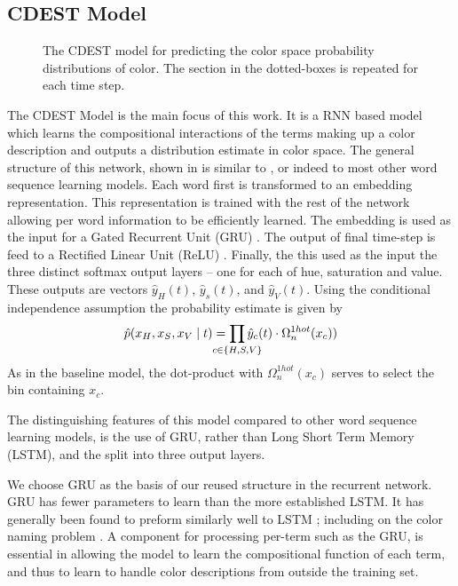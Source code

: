 \documentclass[11pt,letterpaper]{article}
\newcommand{\parencite}{\cite}
\newcommand{\textcite}{\newcite}
\begin{document}
\subsection{CDEST Model}

\begin{figure}
	\resizebox{\columnwidth}{!}{}
	
	\caption{\label{network}
		The CDEST model for predicting the color space probability distributions of color.
		The section in the dotted-boxes is repeated for each time step.
	}
\end{figure}

The CDEST Model is the main focus of this work.
It is a RNN based model which learns the compositional interactions of the terms making up a color description and outputs a distribution estimate in color space.
The general structure of this network, shown in  is similar to \textcite{2016arXiv160603821M}, or indeed to most other word sequence learning models.
Each word first is transformed to an embedding representation.
This representation is trained with the rest of the network allowing per word information to be efficiently learned.
The embedding is used as the input for a Gated Recurrent Unit (GRU)  \parencite{cho2014properties}.
The output of final time-step is feed to a Rectified Linear Unit (ReLU)  \parencite{dahl2013reludropout}.
Finally, the this used as the input the three distinct softmax output layers -- one for each of hue, saturation and value.
These outputs are vectors $\hat{y}_{H}(t)$, $\hat{y}_{s}(t)$, and $\hat{y}_{V}(t)$.
Using the conditional independence assumption the probability estimate is given by
\begin{equation*}%
	\hat{p}(x_H,x_S,x_V\mid t) = \displaystyle\prod_{
		\mathclap{c\in {\{H,S,V\}}}}
	 \hat{y}_{c}(t)\cdot \Omega_{n}^{1hot}(x_c))
\end{equation*}
As in the baseline model, the dot-product with $\Omega_{n}^{1hot}(x_c)$ serves to select the bin containing $x_c$.

The distinguishing features of this model compared to other word sequence learning models, is the use of GRU, rather than Long Short Term Memory (LSTM), and the split into three output layers.


We choose GRU as the basis of our reused structure in the recurrent network.
GRU has fewer parameters to learn than the more established LSTM.
It has generally been found to preform similarly well to LSTM \parencite{chung2014empirical};
including on the color naming problem \parencite{2016arXiv160603821M}.
A component for processing per-term such as the GRU, is essential in allowing the model to learn the compositional function of each term,  and thus to learn to handle color descriptions from outside the training set.
\end{document}
